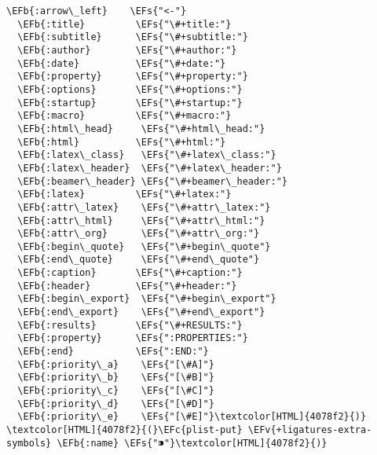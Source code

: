 \documentclass{scrartcl}
\newcommand{\EFs}[1]{\textcolor{EFs}{#1}} %
\newcommand{\EFb}[1]{\textcolor{EFb}{#1}} %
\newcommand{\EFc}[1]{\textcolor{EFc}{#1}} %
\newcommand{\EFv}[1]{\textcolor{EFv}{#1}} %
\begin{document}
\begin{Code}
\begin{Verbatim}[]
  \EFb{:arrow\_left}    \EFs{"<-"}
  \EFb{:title}         \EFs{"\#+title:"}
  \EFb{:subtitle}      \EFs{"\#+subtitle:"}
  \EFb{:author}        \EFs{"\#+author:"}
  \EFb{:date}          \EFs{"\#+date:"}
  \EFb{:property}      \EFs{"\#+property:"}
  \EFb{:options}       \EFs{"\#+options:"}
  \EFb{:startup}       \EFs{"\#+startup:"}
  \EFb{:macro}         \EFs{"\#+macro:"}
  \EFb{:html\_head}     \EFs{"\#+html\_head:"}
  \EFb{:html}          \EFs{"\#+html:"}
  \EFb{:latex\_class}   \EFs{"\#+latex\_class:"}
  \EFb{:latex\_header}  \EFs{"\#+latex\_header:"}
  \EFb{:beamer\_header} \EFs{"\#+beamer\_header:"}
  \EFb{:latex}         \EFs{"\#+latex:"}
  \EFb{:attr\_latex}    \EFs{"\#+attr\_latex:"}
  \EFb{:attr\_html}     \EFs{"\#+attr\_html:"}
  \EFb{:attr\_org}      \EFs{"\#+attr\_org:"}
  \EFb{:begin\_quote}   \EFs{"\#+begin\_quote"}
  \EFb{:end\_quote}     \EFs{"\#+end\_quote"}
  \EFb{:caption}       \EFs{"\#+caption:"}
  \EFb{:header}        \EFs{"\#+header:"}
  \EFb{:begin\_export}  \EFs{"\#+begin\_export"}
  \EFb{:end\_export}    \EFs{"\#+end\_export"}
  \EFb{:results}       \EFs{"\#+RESULTS:"}
  \EFb{:property}      \EFs{":PROPERTIES:"}
  \EFb{:end}           \EFs{":END:"}
  \EFb{:priority\_a}    \EFs{"[\#A]"}
  \EFb{:priority\_b}    \EFs{"[\#B]"}
  \EFb{:priority\_c}    \EFs{"[\#C]"}
  \EFb{:priority\_d}    \EFs{"[\#D]"}
  \EFb{:priority\_e}    \EFs{"[\#E]"}\textcolor[HTML]{4078f2}{)}
\textcolor[HTML]{4078f2}{(}\EFc{plist-put} \EFv{+ligatures-extra-symbols} \EFb{:name} \EFs{"⁍"}\textcolor[HTML]{4078f2}{)}
\end{Verbatim}
\end{Code}
\end{document}
